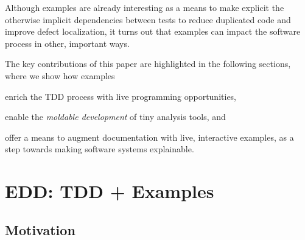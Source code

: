 \documentclass[acmsmall,screen,authorversion,nonacm]{acmart} %
\begin{document}
Although examples are already interesting as a means to make explicit the otherwise implicit dependencies between tests to reduce duplicated code and improve defect localization, it turns out that examples can impact the software process in other, important ways.

The key contributions of this paper are highlighted in the following sections, where we show how examples
\begin{inparaenum}[(i)]
	\item enrich the TDD process with live programming opportunities,
	\item enable the \emph{moldable development} of tiny analysis tools, and
	\item offer a means to augment documentation with live, interactive examples, as a step towards making software systems explainable.
\end{inparaenum}

%
%

\section{EDD: TDD + Examples}\label{sec:edd}


\subsection{Motivation}
\end{document}
